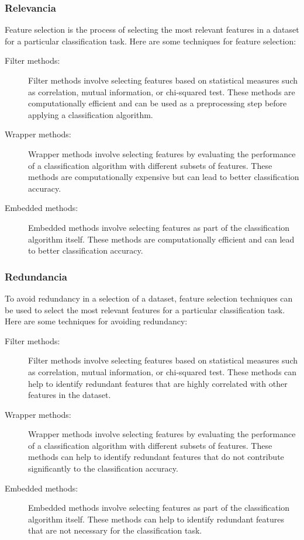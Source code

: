 \documentclass[12pt,a4paper, brazil]{article}
\begin{document}
        \subsubsection{Relevancia}
        Feature selection is the process of selecting the most relevant features in a dataset for a particular classification task. Here are some techniques for feature selection:

            \begin{description}
          \item[Filter methods:] Filter methods involve selecting features based on statistical measures such as correlation, mutual information, or chi-squared test. These methods are computationally efficient and can be used as a preprocessing step before applying a classification algorithm.
        
          \item[Wrapper methods:] Wrapper methods involve selecting features by evaluating the performance of a classification algorithm with different subsets of features. These methods are computationally expensive but can lead to better classification accuracy.
        
          \item[Embedded methods:] Embedded methods involve selecting features as part of the classification algorithm itself. These methods are computationally efficient and can lead to better classification accuracy.
        \end{description}

        \subsubsection{Redundancia}
        To avoid redundancy in a selection of a dataset, feature selection techniques can be used to select the most relevant features for a particular classification task. Here are some techniques for avoiding redundancy:

            \begin{description}
          \item[Filter methods:] Filter methods involve selecting features based on statistical measures such as correlation, mutual information, or chi-squared test. These methods can help to identify redundant features that are highly correlated with other features in the dataset.
        
          \item[Wrapper methods:] Wrapper methods involve selecting features by evaluating the performance of a classification algorithm with different subsets of features. These methods can help to identify redundant features that do not contribute significantly to the classification accuracy.
        
          \item[Embedded methods:] Embedded methods involve selecting features as part of the classification algorithm itself. These methods can help to identify redundant features that are not necessary for the classification task.
        \end{description}
\end{document}
